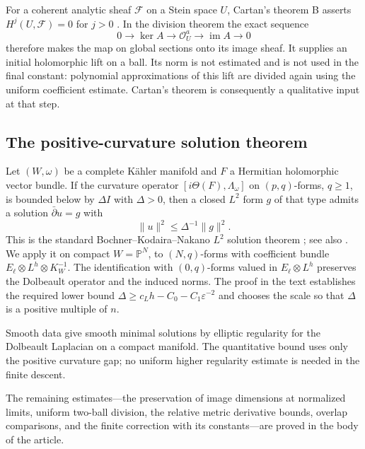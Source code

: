 \documentclass[11pt,reqno]{amsart}
\numberwithin{equation}{section}
\theoremstyle{definition}
\theoremstyle{remark}
\newcommand{\Pj}{\mathbb P}
\newcommand{\cO}{\mathcal O}
\DeclareMathOperator{\im}{im}
\begin{document}
For a coherent analytic sheaf $\mathcal F$ on a Stein space $U$,
Cartan's theorem B asserts $H^j(U,\mathcal F)=0$ for $j>0$
\cite{GrauertRemmert}.  In the division theorem the exact sequence
\[
 0\longrightarrow\ker A\longrightarrow\cO_U^a
   \longrightarrow\im A\longrightarrow0
\]
therefore makes the map on global sections onto its image sheaf.
It supplies an initial holomorphic lift on a ball.  Its norm is not
estimated and is not used in the final constant: polynomial
approximations of this lift are divided again using the uniform
coefficient estimate.  Cartan's theorem is consequently a
qualitative input at that step.

\subsection{The positive-curvature solution theorem}
Let $(W,\omega)$ be a complete K\"ahler manifold and $F$ a Hermitian
holomorphic vector bundle.  If the curvature operator
$[i\Theta(F),\Lambda_\omega]$ on $(p,q)$-forms, $q\ge1$, is bounded
below by $\Delta I$ with $\Delta>0$, then a closed $L^2$ form $g$
of that type admits a solution $\bar\partial u=g$ with
\[
 \|u\|^2\le\Delta^{-1}\|g\|^2.
\]
This is the standard Bochner--Kodaira--Nakano $L^2$ solution theorem
\cite[Theorem~6.1]{DemaillyL2}; see also \cite{Demailly}.  We apply it on compact $W=\Pj^N$, to
$(N,q)$-forms with coefficient bundle
$E_\ell\otimes L^h\otimes K_W^{-1}$.  The identification with
$(0,q)$-forms valued in $E_\ell\otimes L^h$ preserves the
Dolbeault operator and the induced norms.  The proof in the text
establishes the required lower bound
$\Delta\ge c_Lh-C_0-C_1\varepsilon^{-2}$ and chooses the scale
so that $\Delta$ is a positive multiple of $n$.

Smooth data give smooth minimal solutions by elliptic regularity
for the Dolbeault Laplacian on a compact manifold.  The quantitative
bound uses only the positive curvature gap; no uniform higher
regularity estimate is needed in the finite descent.

The remaining estimates---the preservation of image dimensions at
normalized limits, uniform two-ball division, the relative metric
derivative bounds, overlap comparisons, and the finite correction
with its constants---are proved in the body of the article.
\end{document}
